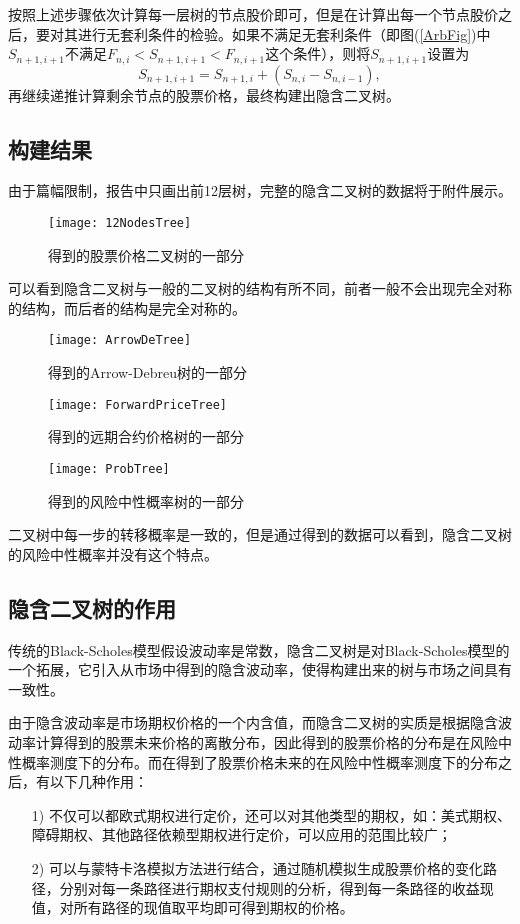 按照上述步骤依次计算每一层树的节点股价即可，但是在计算出每一个节点股价之后，要对其进行无套利条件的检验。如果不满足无套利条件（即图(\ref{ArbFig})中$S_{n+1,i+1}$不满足$F_{n,i}<S_{n+1,i+1}<F_{n,i+1}$这个条件），则将$S_{n+1,i+1}$设置为
$$S_{n+1,i+1} = S_{n+1,i}+\left(S_{n,i}-S_{n,i-1}\right), $$
再继续递推计算剩余节点的股票价格，最终构建出隐含二叉树。


\subsection{构建结果}
由于篇幅限制，报告中只画出前12层树，完整的隐含二叉树的数据将于附件展示。
\begin{figure}[H]
	\centering
	\texttt{[image: 12NodesTree]}
	\caption{得到的股票价格二叉树的一部分}
\end{figure}
可以看到隐含二叉树与一般的二叉树的结构有所不同，前者一般不会出现完全对称的结构，而后者的结构是完全对称的。
\begin{figure}[H]
	\centering
	\texttt{[image: ArrowDeTree]}
	\caption{得到的Arrow-Debreu树的一部分}
\end{figure}
\begin{figure}[H]
	\centering
	\texttt{[image: ForwardPriceTree]}
	\caption{得到的远期合约价格树的一部分}
\end{figure}
\begin{figure}[H]
	\centering
	\texttt{[image: ProbTree]}
	\caption{得到的风险中性概率树的一部分}
\end{figure}
二叉树中每一步的转移概率是一致的，但是通过得到的数据可以看到，隐含二叉树的风险中性概率并没有这个特点。

\subsection{隐含二叉树的作用}
传统的Black-Scholes模型假设波动率是常数，隐含二叉树是对Black-Scholes模型的一个拓展，它引入从市场中得到的隐含波动率，使得构建出来的树与市场之间具有一致性。

由于隐含波动率是市场期权价格的一个内含值，而隐含二叉树的实质是根据隐含波动率计算得到的股票未来价格的离散分布，因此得到的股票价格的分布是在风险中性概率测度下的分布。而在得到了股票价格未来的在风险中性概率测度下的分布之后，有以下几种作用：
\begin{enumerate}
	\item [1)] 不仅可以都欧式期权进行定价，还可以对其他类型的期权，如：美式期权、障碍期权、其他路径依赖型期权进行定价，可以应用的范围比较广；
	\item [2)]可以与蒙特卡洛模拟方法进行结合，通过随机模拟生成股票价格的变化路径，分别对每一条路径进行期权支付规则的分析，得到每一条路径的收益现值，对所有路径的现值取平均即可得到期权的价格。
\end{enumerate}

